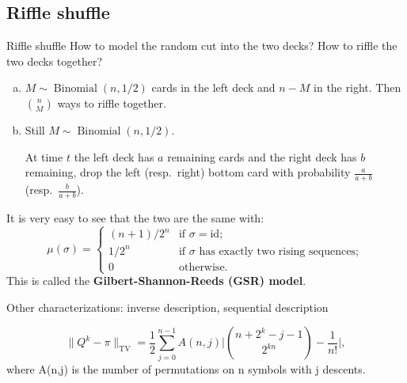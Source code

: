 \documentclass[10pt]{beamer}
\newcommand{\nm}[1]{\lVert #1 \rVert_\mathrm{TV}}
\newcommand{\df}[1]{\textbf{#1}} %
\begin{document}
\subsection{Riffle shuffle}
\begin{frame}[allowframebreaks]{Riffle shuffle}
        How to model the random cut into the two decks? How to riffle the two decks together?
        \begin{enumerate}[a)]
            \item $M \sim \operatorname{Binomial}(n,1/2)$ cards in the left deck and $n - M$ in the right. Then $\binom{n}{M}$ ways to riffle together.
            \item Still $M \sim \operatorname{Binomial}(n,1/2)$.
            
            At time $t$ the left deck has $a$ remaining cards and the right deck has $b$ remaining, drop the left (resp.\ right) bottom card with probability $\frac{a}{a+b}$ (resp.\ $\frac{b}{a+b}$).
        \end{enumerate}
        It is very easy to see that the two are the same with: 
        \[\mu(\sigma) = \begin{cases}
            (n+1)/{2^n} & \text{if }\sigma = \mathrm{id}; \\ %
            1/2^n & \text{if }\sigma\text{ has exactly two rising sequences}; \\
            0 & \text{otherwise}.
        \end{cases}\]
        This is called the \df{Gilbert-Shannon-Reeds (GSR) model}.

    \framebreak
    Other characterizations: inverse description, sequential description
    \begin{theorem}
        \[
        \nm{Q^k - \pi} = \frac{1}{2}\sum_{j=0}^{n-1} A(n,j)\bigg\lvert \binom{n+2^k-j-1}{2^{kn}} - \frac{1}{n!}\bigg\rvert,
        \]
        where A(n,j) is the number of permutations on n symbols with j descents. %
    \end{theorem}
\end{frame}
\end{document}
